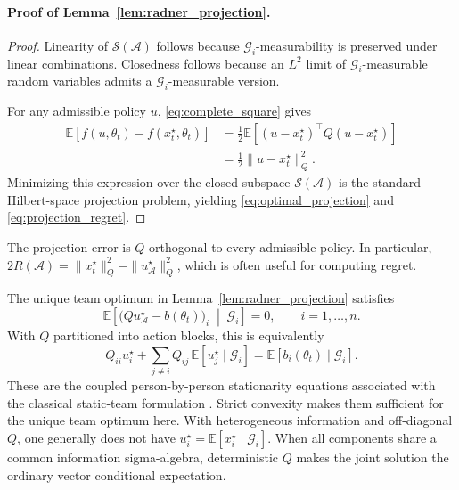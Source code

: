 \paragraph{Proof of Lemma~\ref{lem:radner_projection}.}
\begin{proof}
Linearity of $\mathcal{S}(\mathcal{A})$ follows because
$\mathcal{G}_i$-measurability is preserved under linear combinations.
Closedness follows because an $L^2$ limit of
$\mathcal{G}_i$-measurable random variables admits a
$\mathcal{G}_i$-measurable version.

For any admissible policy $u$, \eqref{eq:complete_square} gives
\begin{align}
    \mathbb{E}
    \left[
        f(u,\theta_t)
        -
        f(x_t^\star,\theta_t)
    \right]
    &=
    \frac{1}{2}
    \mathbb{E}
    \left[
        (u-x_t^\star)^\top
        Q
        (u-x_t^\star)
    \right]
    \nonumber\\
    &=
    \frac{1}{2}
    \|u-x_t^\star\|_Q^2.
    \label{eq:projection_proof}
\end{align}
Minimizing this expression over the closed subspace
$\mathcal{S}(\mathcal{A})$ is the standard Hilbert-space projection problem,
yielding \eqref{eq:optimal_projection} and \eqref{eq:projection_regret}.
\end{proof}

The projection error is $Q$-orthogonal to every admissible policy. In particular,
$2R(\mathcal A)=\|x_t^\star\|_Q^2-\|u_{\mathcal A}^\star\|_Q^2$,
which is often useful for computing regret.

\begin{corollary}
\label{cor:conditional_normal_equations}
The unique team optimum in Lemma~\ref{lem:radner_projection} satisfies
\begin{equation}
    \boxed{
    \mathbb E\!\left[
      \bigl(Q u_{\mathcal A}^{\star}-b(\theta_t)\bigr)_i
      \;\middle|\;
      \mathcal G_i
    \right]
    =0,
    \qquad i=1,\ldots,n.
    }
    \label{eq:conditional_normal_equations}
\end{equation}
With $Q$ partitioned into action blocks, this is equivalently
\begin{equation}
Q_{ii}u_i^\star
+
\sum_{j\ne i}Q_{ij}\,
\mathbb E[u_j^\star\mid\mathcal G_i]
=
\mathbb E[b_i(\theta_t)\mid\mathcal G_i].
\label{eq:block_conditional_normal_equations}
\end{equation}
These are the coupled person-by-person stationarity equations associated with
the classical static-team formulation \cite{radner1962team}. Strict convexity
makes them sufficient for the unique team optimum here. With heterogeneous
information and
off-diagonal $Q$, one generally does not have
$u_i^\star=\mathbb E[x_i^\star\mid\mathcal G_i]$. When all components share a
common information sigma-algebra, deterministic $Q$ makes the joint solution
the ordinary vector conditional expectation.
\end{corollary}


